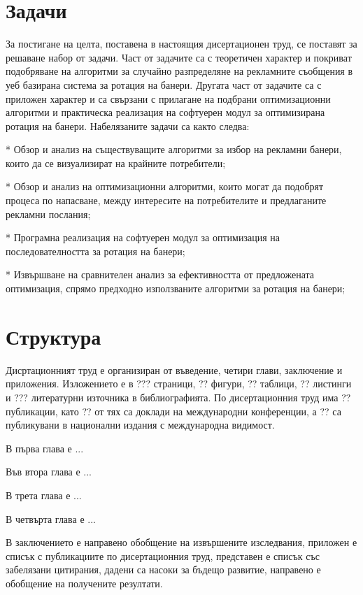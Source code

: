 \section*{Задачи}

За постигане на целта, поставена в настоящия дисертационен труд, се поставят за решаване набор от задачи. Част от задачите са с теоретичен характер и покриват подобряване на алгоритми за случайно разпределяне на рекламните съобщения в уеб базирана система за ротация на банери. Другата част от задачите са с приложен характер и са свързани с прилагане на подбрани оптимизационни алгоритми и практическа реализация на софтуерен модул за оптимизирана ротация на банери. Набелязаните задачи са както следва:

* Обзор и анализ на съществуващите алгоритми за избор на рекламни банери, които да се визуализират на крайните потребители;

* Обзор и анализ на оптимизационни алгоритми, които могат да подобрят процеса по напасване, между интересите на потребителите и предлаганите рекламни послания;

* Програмна реализация на софтуерен модул за оптимизация на последователността за ротация на банери;

* Извършване на сравнителен анализ за ефективността от предложената оптимизация, спрямо предходно използваните алгоритми за ротация на банери;

\section*{Структура}

Дисртационният труд е организиран от въведение, четири глави, заключение и приложения. Изложението е в ??? страници, ?? фигури, ?? таблици, ?? листинги и ??? литературни източника в библиографията. По дисертационния труд има ?? публикации, като ?? от тях са доклади на международни конференции, а ?? са публикувани в национални издания с международна видимост. 

В първа глава е ...

Във втора глава е ...

В трета глава е ...

В четвърта глава е ...

В заключението е направено обобщение на извършените изследвания, приложен е списък с публикациите по дисертационния труд, представен е списък със забелязани цитирания, дадени са насоки за бъдещо развитие, направено е обобщение на получените резултати.

